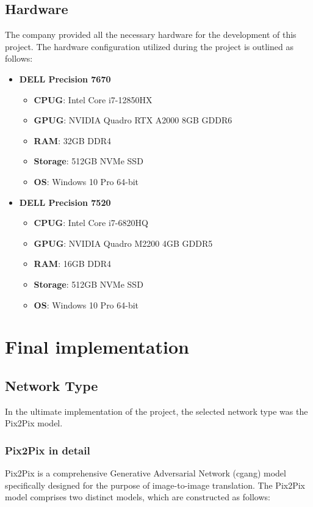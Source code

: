 \subsection{Hardware}\label{subsec:hardware}
The company provided all the necessary hardware for the development of this project. 
The hardware configuration utilized during the project is outlined as follows: \\
\begin{itemize}
    \item \textbf{DELL Precision 7670}
    \begin{itemize}
        \item \textbf{\gls{CPUG}\glsfirstoccur}: Intel Core i7-12850HX
        \item \textbf{\gls{GPUG}}: NVIDIA Quadro RTX A2000 8GB GDDR6
        \item \textbf{RAM}: 32GB DDR4
        \item \textbf{Storage}: 512GB NVMe SSD
        \item \textbf{OS}: Windows 10 Pro 64-bit
    \end{itemize}
    \item \textbf{DELL Precision 7520}
    \begin{itemize}
        \item \textbf{\gls{CPUG}}: Intel Core i7-6820HQ
        \item \textbf{\gls{GPUG}}: NVIDIA Quadro M2200 4GB GDDR5
        \item \textbf{RAM}: 16GB DDR4
        \item \textbf{Storage}: 512GB NVMe SSD
        \item \textbf{OS}: Windows 10 Pro 64-bit
    \end{itemize}
\end{itemize}
\section{Final implementation}\label{sec:final-implementation}
\subsection{Network Type}\label{subsec:network-type}
In the ultimate implementation of the project, the selected network type was the Pix2Pix model.
\subsubsection{Pix2Pix in detail}\label{subsubsec:pix2pix-in-detail}
Pix2Pix is a comprehensive Generative Adversarial Network (\gls{cgang}) model specifically designed for the purpose of image-to-image translation. 
The Pix2Pix model comprises two distinct models, which are constructed as follows:

